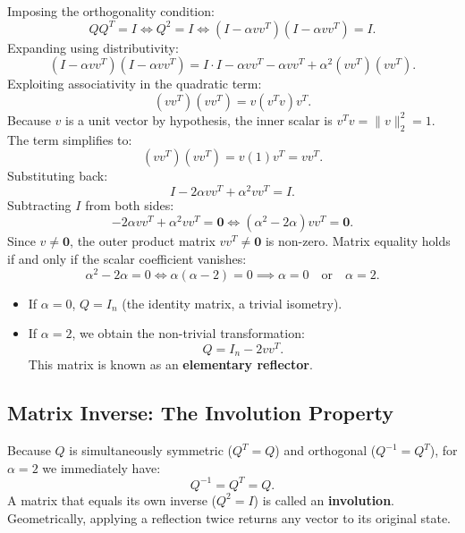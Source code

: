 Imposing the orthogonality condition:
\begin{equation}
    Q Q^T = I \iff Q^2 = I \iff (I - \alpha v v^T)(I - \alpha v v^T) = I.
\end{equation}
Expanding using distributivity:
\begin{equation}
    (I - \alpha v v^T)(I - \alpha v v^T) = I \cdot I - \alpha v v^T - \alpha v v^T + \alpha^2 (v v^T)(v v^T).
\end{equation}
Exploiting associativity in the quadratic term:
\begin{equation}
    (v v^T)(v v^T) = v (v^T v) v^T.
\end{equation}
Because $v$ is a unit vector by hypothesis, the inner scalar is $v^T v = \|v\|_2^2 = 1$. The term simplifies to:
\begin{equation}
    (v v^T)(v v^T) = v (1) v^T = v v^T.
\end{equation}
Substituting back:
\begin{equation}
    I - 2\alpha v v^T + \alpha^2 v v^T = I.
\end{equation}
Subtracting $I$ from both sides:
\begin{equation}
    -2\alpha v v^T + \alpha^2 v v^T = \mathbf{0} \iff (\alpha^2 - 2\alpha) v v^T = \mathbf{0}.
\end{equation}
Since $v \neq \mathbf{0}$, the outer product matrix $v v^T \neq \mathbf{0}$ is non-zero. Matrix equality holds if and only if the scalar coefficient vanishes:
\begin{equation}
    \alpha^2 - 2\alpha = 0 \iff \alpha(\alpha - 2) = 0 \implies \alpha = 0 \quad \text{or} \quad \alpha = 2.
\end{equation}

\begin{itemize}
    \item If $\alpha = 0$, $Q = I_n$ (the identity matrix, a trivial isometry).
    \item If $\alpha = 2$, we obtain the non-trivial transformation:
    \begin{equation}
        Q = I_n - 2 v v^T.
    \end{equation}
    This matrix is known as an \textbf{elementary reflector}.
\end{itemize}

\subsection{Matrix Inverse: The Involution Property}
Because $Q$ is simultaneously symmetric ($Q^T = Q$) and orthogonal ($Q^{-1} = Q^T$), for $\alpha = 2$ we immediately have:
\begin{equation}
    Q^{-1} = Q^T = Q.
\end{equation}
A matrix that equals its own inverse ($Q^2 = I$) is called an \textbf{involution}. Geometrically, applying a reflection twice returns any vector to its original state.


